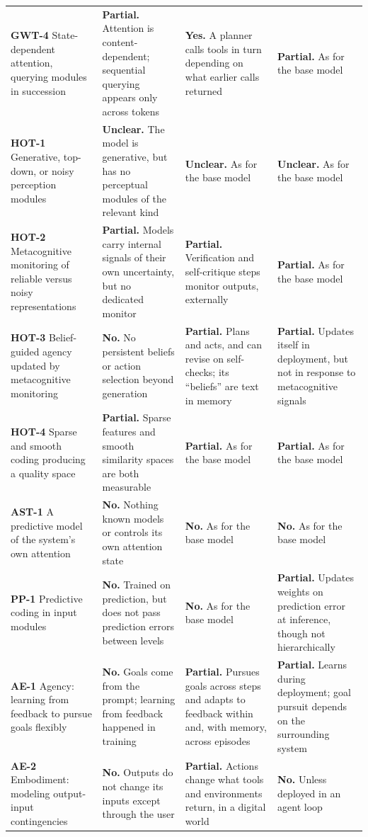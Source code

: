 \documentclass[11pt,letterpaper]{article}
\begin{document}
{\begin{longtable}{L{2.7cm}L{4.35cm}L{4.35cm}L{4.35cm}}
\textbf{GWT-4} State-dependent attention, querying modules in succession & \textbf{Partial.} Attention is content-dependent; sequential querying appears only across tokens & \textbf{Yes.} A planner calls tools in turn depending on what earlier calls returned & \textbf{Partial.} As for the base model \\
\textbf{HOT-1} Generative, top-down, or noisy perception modules & \textbf{Unclear.} The model is generative, but has no perceptual modules of the relevant kind & \textbf{Unclear.} As for the base model & \textbf{Unclear.} As for the base model \\
\textbf{HOT-2} Metacognitive monitoring of reliable versus noisy representations & \textbf{Partial.} Models carry internal signals of their own uncertainty, but no dedicated monitor & \textbf{Partial.} Verification and self-critique steps monitor outputs, externally & \textbf{Partial.} As for the base model \\
\textbf{HOT-3} Belief-guided agency updated by metacognitive monitoring & \textbf{No.} No persistent beliefs or action selection beyond generation & \textbf{Partial.} Plans and acts, and can revise on self-checks; its ``beliefs'' are text in memory & \textbf{Partial.} Updates itself in deployment, but not in response to metacognitive signals \\
\textbf{HOT-4} Sparse and smooth coding producing a quality space & \textbf{Partial.} Sparse features and smooth similarity spaces are both measurable & \textbf{Partial.} As for the base model & \textbf{Partial.} As for the base model \\
\textbf{AST-1} A predictive model of the system's own attention & \textbf{No.} Nothing known models or controls its own attention state & \textbf{No.} As for the base model & \textbf{No.} As for the base model \\
\textbf{PP-1} Predictive coding in input modules & \textbf{No.} Trained on prediction, but does not pass prediction errors between levels & \textbf{No.} As for the base model & \textbf{Partial.} Updates weights on prediction error at inference, though not hierarchically \\
\textbf{AE-1} Agency: learning from feedback to pursue goals flexibly & \textbf{No.} Goals come from the prompt; learning from feedback happened in training & \textbf{Partial.} Pursues goals across steps and adapts to feedback within and, with memory, across episodes & \textbf{Partial.} Learns during deployment; goal pursuit depends on the surrounding system \\
\textbf{AE-2} Embodiment: modeling output-input contingencies & \textbf{No.} Outputs do not change its inputs except through the user & \textbf{Partial.} Actions change what tools and environments return, in a digital world & \textbf{No.} Unless deployed in an agent loop \\
\end{longtable}
}
\end{document}
